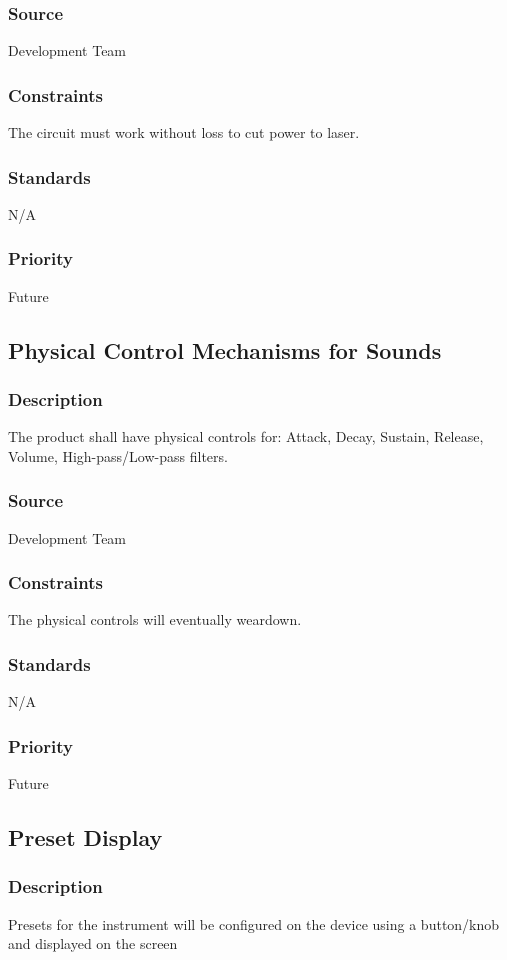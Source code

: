 \subsubsection{Source}
Development Team
\subsubsection{Constraints}
The circuit must work without loss to cut power to laser. 
\subsubsection{Standards}
N/A
\subsubsection{Priority}
Future

\subsection{Physical Control Mechanisms for Sounds}
\subsubsection{Description}
The product shall have physical controls for: Attack, Decay, Sustain, Release, Volume, High-pass/Low-pass filters.
\subsubsection{Source}
Development Team
\subsubsection{Constraints}
The physical controls will eventually weardown. 
\subsubsection{Standards}
N/A
\subsubsection{Priority}
Future

\subsection{Preset Display}
\subsubsection{Description}
Presets for the instrument will be configured on the device using a button/knob and displayed on the screen
